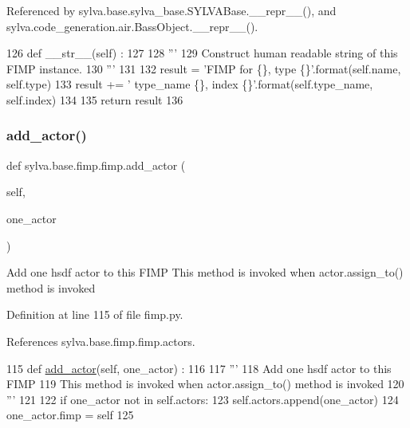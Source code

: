 Referenced by sylva.\+base.\+sylva\+\_\+base.\+S\+Y\+L\+V\+A\+Base.\+\_\+\+\_\+repr\+\_\+\+\_\+(), and sylva.\+code\+\_\+generation.\+air.\+Bass\+Object.\+\_\+\+\_\+repr\+\_\+\+\_\+().


\begin{DoxyCode}
126     \textcolor{keyword}{def }\_\_str\_\_(self) :
127 
128       \textcolor{stringliteral}{'''}
129 \textcolor{stringliteral}{        Construct human readable string of this FIMP instance.}
130 \textcolor{stringliteral}{      '''}
131 
132       result = \textcolor{stringliteral}{'FIMP for \{\}, type \{\}'}.format(self.name, self.type)
133       result += \textcolor{stringliteral}{' type\_name \{\}, index \{\}'}.format(self.type\_name, self.index)
134 
135       \textcolor{keywordflow}{return} result
136 
\end{DoxyCode}
\mbox{\label{classsylva_1_1base_1_1fimp_1_1fimp_aae44656de7647ed6e62eaaec05022b42}} 
\subsubsection{\texorpdfstring{add\+\_\+actor()}{add\_actor()}}
{\footnotesize\ttfamily def sylva.\+base.\+fimp.\+fimp.\+add\+\_\+actor (\begin{DoxyParamCaption}\item[{}]{self,  }\item[{}]{one\+\_\+actor }\end{DoxyParamCaption})}

\begin{DoxyVerb}  Add one hsdf actor to this FIMP
  This method is invoked when actor.assign_to() method is invoked
\end{DoxyVerb}
 

Definition at line 115 of file fimp.\+py.



References sylva.\+base.\+fimp.\+fimp.\+actors.


\begin{DoxyCode}
115     \textcolor{keyword}{def }\hyperlink{namespacesylva_1_1base_1_1sdf_a2fc075a9dc81209dee7a5b97d99640e5}{add\_actor}(self, one\_actor) :
116 
117       \textcolor{stringliteral}{'''}
118 \textcolor{stringliteral}{        Add one hsdf actor to this FIMP}
119 \textcolor{stringliteral}{        This method is invoked when actor.assign\_to() method is invoked}
120 \textcolor{stringliteral}{      '''}
121 
122       \textcolor{keywordflow}{if} one\_actor \textcolor{keywordflow}{not} \textcolor{keywordflow}{in} self.actors:
123         self.actors.append(one\_actor)
124         one\_actor.fimp = self
125 
\end{DoxyCode}
\mbox{\label{classsylva_1_1base_1_1fimp_1_1fimp_a3a158e5ef136d9a8bf4a8d2e14f7b042}} 

